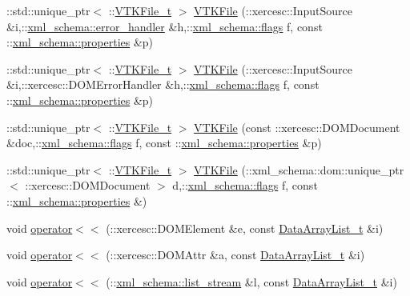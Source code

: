 \begin{DoxyCompactItemize}
\+::std\+::unique\+\_\+ptr$<$ \+::\hyperlink{classVTKFile__t}{V\+T\+K\+File\+\_\+t} $>$ \hyperlink{vtk-unstructured_8cpp_a9416751c118590b52f5eef00b3e279f4}{V\+T\+K\+File} (\+::xercesc\+::\+Input\+Source \&i,\+::\hyperlink{namespacexml__schema_a0a5d9528e9175cedf199984a8bb64d62}{xml\+\_\+schema\+::error\+\_\+handler} \&h,\+::\hyperlink{namespacexml__schema_a0612287d030cb2732d31a45b258fdc87}{xml\+\_\+schema\+::flags} f, const \+::\hyperlink{namespacexml__schema_a1a8ebac679580b41baebd62c7d641c1d}{xml\+\_\+schema\+::properties} \&p)
\item 
\+::std\+::unique\+\_\+ptr$<$ \+::\hyperlink{classVTKFile__t}{V\+T\+K\+File\+\_\+t} $>$ \hyperlink{vtk-unstructured_8cpp_aa061a6ed30d48ee41e5afe4aaf0ad5e9}{V\+T\+K\+File} (\+::xercesc\+::\+Input\+Source \&i,\+::xercesc\+::\+D\+O\+M\+Error\+Handler \&h,\+::\hyperlink{namespacexml__schema_a0612287d030cb2732d31a45b258fdc87}{xml\+\_\+schema\+::flags} f, const \+::\hyperlink{namespacexml__schema_a1a8ebac679580b41baebd62c7d641c1d}{xml\+\_\+schema\+::properties} \&p)
\item 
\+::std\+::unique\+\_\+ptr$<$ \+::\hyperlink{classVTKFile__t}{V\+T\+K\+File\+\_\+t} $>$ \hyperlink{vtk-unstructured_8cpp_a2a3d3d83c62a34394c30b3d5779aacc5}{V\+T\+K\+File} (const \+::xercesc\+::\+D\+O\+M\+Document \&doc,\+::\hyperlink{namespacexml__schema_a0612287d030cb2732d31a45b258fdc87}{xml\+\_\+schema\+::flags} f, const \+::\hyperlink{namespacexml__schema_a1a8ebac679580b41baebd62c7d641c1d}{xml\+\_\+schema\+::properties} \&p)
\item 
\+::std\+::unique\+\_\+ptr$<$ \+::\hyperlink{classVTKFile__t}{V\+T\+K\+File\+\_\+t} $>$ \hyperlink{vtk-unstructured_8cpp_aedf3353c8a0b2d2ef7ea1c2e94fe0ea6}{V\+T\+K\+File} (\+::xml\+\_\+schema\+::dom\+::unique\+\_\+ptr$<$ \+::xercesc\+::\+D\+O\+M\+Document $>$ d,\+::\hyperlink{namespacexml__schema_a0612287d030cb2732d31a45b258fdc87}{xml\+\_\+schema\+::flags} f, const \+::\hyperlink{namespacexml__schema_a1a8ebac679580b41baebd62c7d641c1d}{xml\+\_\+schema\+::properties} \&)
\item 
void \hyperlink{vtk-unstructured_8cpp_a61ab4b44692dc25fbed88bd01294b3a6}{operator$<$$<$} (\+::xercesc\+::\+D\+O\+M\+Element \&e, const \hyperlink{classDataArrayList__t}{Data\+Array\+List\+\_\+t} \&i)
\item 
void \hyperlink{vtk-unstructured_8cpp_a7630c2ebfb09fec59ec9744ab4de05a1}{operator$<$$<$} (\+::xercesc\+::\+D\+O\+M\+Attr \&a, const \hyperlink{classDataArrayList__t}{Data\+Array\+List\+\_\+t} \&i)
\item 
void \hyperlink{vtk-unstructured_8cpp_a15e37609fa21b26bacce23662c522124}{operator$<$$<$} (\+::\hyperlink{namespacexml__schema_a840728106ddd08800e62729d4eddbbc8}{xml\+\_\+schema\+::list\+\_\+stream} \&l, const \hyperlink{classDataArrayList__t}{Data\+Array\+List\+\_\+t} \&i)

\end{DoxyCompactItemize}
